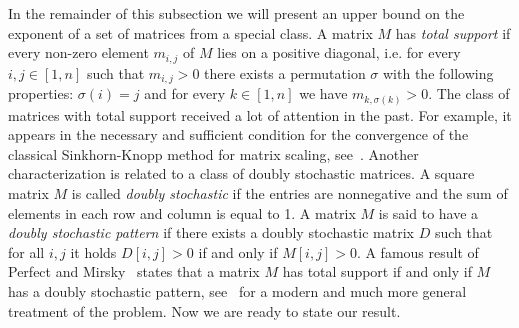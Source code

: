 \documentclass[a4paper,USenglish]{lipics}
\theoremstyle{definition}
\begin{document}
In the remainder of this subsection we will present an upper bound on the exponent of a set of matrices from a special class. A matrix $M$ has \emph{total support} if every non-zero element $m_{i,j}$ of $M$ lies on a positive diagonal, i.e. for every $i,j \in [1,n]$ such that $m_{i,j}>0$ there exists a permutation $\sigma$ with the following properties: $\sigma(i)=j$ and for every $k \in [1,n]$ we have $m_{k, \sigma (k)} > 0$. The class of matrices with total support received a lot of attention in the past. For example, it appears in the necessary and sufficient condition for the convergence of the classical Sinkhorn-Knopp method for matrix scaling, see~\cite{SK67}. Another characterization is related to a class of doubly stochastic matrices.
A square matrix $M$ is called \emph{doubly stochastic} if the entries are nonnegative and the sum of elements in each row and column is equal to 1.
A matrix $M$ is said to have a \emph{doubly stochastic pattern} if there exists a doubly stochastic matrix $D$ such that for all $i,j$ it holds $D[i,j]>0$ if and only if $M[i,j]>0$. A famous result of Perfect and Mirsky~\cite{PM65} states that a matrix $M$ has total support if and only if $M$ has a doubly stochastic pattern, see~\cite[Theorem 9.2.1]{Bru06} for a modern and much more general treatment of the problem. Now we are ready to state our result.
\end{document}
